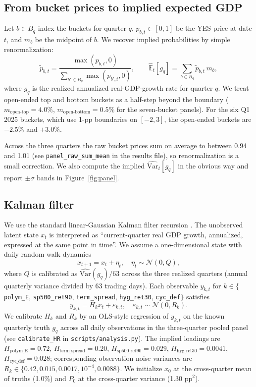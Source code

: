 \documentclass{article}
\begin{document}
\subsection{From bucket prices to implied expected GDP}
\label{sec:method:agg}
Let $b\in B_q$ index the buckets for quarter $q$, $p_{b,t}\in[0,1]$ be the YES price at
date $t$, and $m_b$ be the midpoint of $b$. We recover implied probabilities by simple
renormalization:
\begin{equation}
  \tilde p_{b,t} = \frac{\max(p_{b,t},0)}{\sum_{b'\in B_q}\max(p_{b',t},0)},\qquad
  \widehat{\mathbb{E}}_t[g_q] = \sum_{b\in B_q} \tilde p_{b,t}\, m_b,
\end{equation}
where $g_q$ is the realized annualized real-GDP-growth rate for quarter $q$. We treat
open-ended top and bottom buckets as a half-step beyond the boundary
($m_{\text{open-top}}=4.0\%$, $m_{\text{open-bottom}}=0.5\%$ for the seven-bucket panels).
For the six Q1 2025 buckets, which use 1-pp boundaries on $[-2,3]$, the open-ended buckets
are $-2.5\%$ and $+3.0\%$.

Across the three quarters the raw bucket prices sum on average to between 0.94 and 1.01
(see \texttt{panel\_raw\_sum\_mean} in the results file), so renormalization is a small
correction. We also compute the implied $\widehat{\mathrm{Var}}_t[g_q]$ in the obvious way and
report $\pm\sigma$ bands in Figure~\ref{fig:panel}.

\subsection{Kalman filter}
We use the standard linear-Gaussian Kalman filter recursion \citep{kalman1960new}. The
unobserved latent state $x_t$ is interpreted as ``current-quarter real GDP growth,
annualized, expressed at the same point in time''. We assume a one-dimensional state with daily random
walk dynamics
\begin{equation}
  x_{t+1} = x_t + \eta_t,\quad \eta_t \sim \mathcal{N}(0,Q),
\end{equation}
where $Q$ is calibrated as $\widehat{\mathrm{Var}}(g_q)/63$ across the three realized
quarters (annual quarterly variance divided by 63 trading days). Each observable
$y_{k,t}$ for $k\in\{$\texttt{polym\_E}, \texttt{sp500\_ret90}, \texttt{term\_spread},
\texttt{hyg\_ret30}, \texttt{cyc\_def}$\}$ satisfies
\begin{equation}
  y_{k,t} = H_k x_t + \varepsilon_{k,t},\quad \varepsilon_{k,t}\sim\mathcal{N}(0,R_k).
\end{equation}
We calibrate $H_k$ and $R_k$ by an OLS-style regression of $y_{k,t}$ on the known
quarterly truth $g_q$ across all daily observations in the three-quarter pooled panel
(see \texttt{calibrate\_HR} in \texttt{scripts/analysis.py}). The implied loadings are
$H_{\text{polym\_E}}=0.72$, $H_{\text{term\_spread}}=0.20$,
$H_{\text{sp500\_ret90}}=0.029$, $H_{\text{hyg\_ret30}}=0.0041$,
$H_{\text{cyc\_def}}=0.028$; corresponding observation-noise variances are $R_k\in
\{0.42, 0.015, 0.0017, 10^{-4}, 0.0088\}$. We initialize $x_0$ at the cross-quarter
mean of truths (1.0\%) and $P_0$ at the cross-quarter variance (1.30 pp$^2$).
\end{document}
